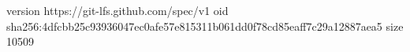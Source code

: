 version https://git-lfs.github.com/spec/v1
oid sha256:4dfcbb25c93936047ec0afe57e815311b061dd0f78cd85eaff7c29a12887aea5
size 10509
